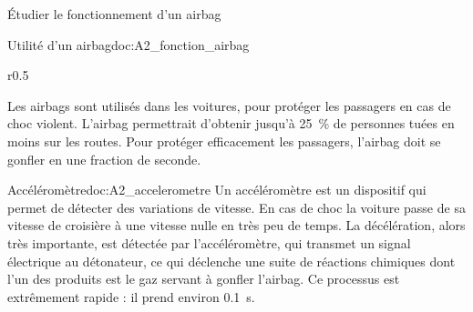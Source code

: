 \teteTermStssRout



\begin{objectifs}
  \item Étudier le fonctionnement d'un airbag
\end{objectifs}


\begin{doc}{Utilité d'un airbag}{doc:A2_fonction_airbag}
  \begin{wrapfigure}{r}{0.5\linewidth}  
    \centering
    \vspace*{-24pt}
     \\[4pt]
  \end{wrapfigure}
  
  Les airbags sont utilisés dans les voitures, pour protéger les passagers en cas de choc violent.
  L'airbag permettrait d'obtenir jusqu'à \qty{25}{\percent} de personnes tuées en moins sur les routes.
  Pour protéger efficacement les passagers, l'airbag doit se gonfler en une fraction de seconde.
\end{doc}

\begin{doc}{Accéléromètre}{doc:A2_accelerometre}
  Un accéléromètre est un dispositif qui permet de détecter des variations de vitesse.
  En cas de choc la voiture passe de sa vitesse de croisière à une vitesse nulle en très peu de temps.
  La décélération, alors très importante, est détectée par l'accéléromètre, qui transmet un signal électrique au détonateur, ce qui déclenche une suite de réactions chimiques dont l'un des produits est le gaz servant à gonfler l'airbag.
  Ce processus est extrêmement rapide : il prend environ \qty{0,1}{\s}.
\end{doc}

